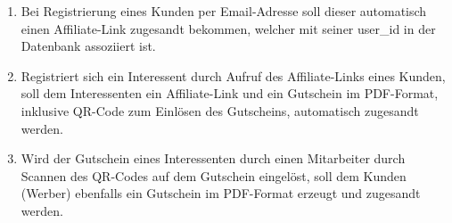 \begin{enumerate}[itemsep=0em,partopsep=0em,parsep=0em,topsep=0em]
\begin{enumerate}
            \item Bei Registrierung eines Kunden per Email-Adresse soll dieser 
            automatisch einen Affiliate-Link zugesandt bekommen, welcher mit seiner
            user\_id in der Datenbank assoziiert ist.
            \item Registriert sich ein Interessent durch Aufruf des Affiliate-Links eines Kunden, soll dem Interessenten ein Affiliate-Link und ein Gutschein
            im \ac{PDF}-Format, inklusive \ac{QR}-Code zum Einlösen des Gutscheins, 
            automatisch zugesandt werden. 
            \item Wird der Gutschein eines Interessenten durch einen Mitarbeiter durch Scannen des \ac{QR}-Codes auf dem Gutschein eingelöst, soll dem Kunden (Werber) ebenfalls ein Gutschein im \ac{PDF}-Format erzeugt und zugesandt werden.
        \end{enumerate}
\end{enumerate}

